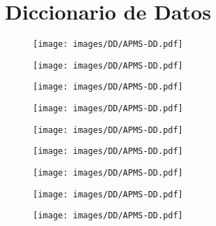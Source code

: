 \chapter{Diccionario de Datos}
\begin{figure}
	\begin{center}
    		\texttt{[image: images/DD/APMS-DD.pdf]}
	\end{center}
\end{figure}
\begin{figure}
	\begin{center}
    		\texttt{[image: images/DD/APMS-DD.pdf]}
	\end{center}
\end{figure}
\begin{figure}
	\begin{center}
    		\texttt{[image: images/DD/APMS-DD.pdf]}
	\end{center}
\end{figure}
\begin{figure}
	\begin{center}
    		\texttt{[image: images/DD/APMS-DD.pdf]}
	\end{center}
\end{figure}
\begin{figure}
	\begin{center}
    		\texttt{[image: images/DD/APMS-DD.pdf]}
	\end{center}
\end{figure}
\begin{figure}
	\begin{center}
    		\texttt{[image: images/DD/APMS-DD.pdf]}
	\end{center}
\end{figure}
\begin{figure}
	\begin{center}
    		\texttt{[image: images/DD/APMS-DD.pdf]}
	\end{center}
\end{figure}
\begin{figure}
	\begin{center}
    		\texttt{[image: images/DD/APMS-DD.pdf]}
	\end{center}
\end{figure}
\begin{figure}
	\begin{center}
    		\texttt{[image: images/DD/APMS-DD.pdf]}
	\end{center}
\end{figure}
